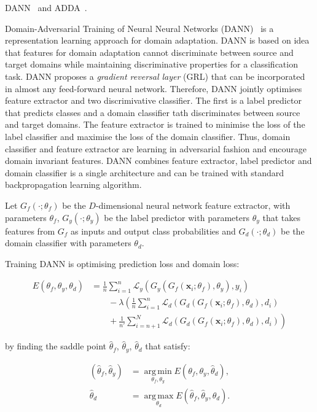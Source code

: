 DANN~\cite{ganin2016} and ADDA~\cite{tzeng2017}.

Domain-Adversarial Training of Neural Neural Networks (DANN)~\cite{ganin2016}
is a representation learning approach for domain adaptation.
DANN is based on idea that features for domain adaptation
cannot discriminate between source and target domains
while maintaining discriminative properties for a classification task.
DANN proposes a \textit{gradient reversal layer} (GRL)
that can be incorporated in almost any feed-forward neural network.
Therefore, DANN jointly optimises feature extractor
and two discrimivative classifier.
The first is a label predictor that predicts classes
and a domain classifier tath discriminates between source and target domains.
The feature extractor is trained to minimise the loss of the label classifier
and maximise the loss of the domain classifier.
Thus, domain classifier and feature extractor are learning in adversarial fashion and encourage domain invariant features.
DANN combines feature extractor, label predictor and domain classifier is a single architecture
and can be trained with standard backpropagation learning algorithm.

Let \(G_f(\cdot; \theta_f)\) be the \(D\)-dimensional neural network feature extractor, with parameters \(\theta_f\),
\(G_y(\cdot; \theta_y)\) be the label predictor with parameters \(\theta_y\)
that takes features from \(G_f\) as inputs and output class probabilities
and \(G_d(\cdot; \theta_d)\) be the domain classifier with parameters \(\theta_d\).

Training DANN is optimising prediction loss and domain loss:

\begin{align}
	E(\theta_f, \theta_y, \theta_d) &= \frac{1}{n} \sum^{n}_{i = 1} \mathcal{L}_y(G_y(G_f(\mathbf{x}_i; \theta_f), \theta_y), y_i) \nonumber \\
	&\qquad {} - \lambda \left(\frac{1}{n} \sum^{n}_{i = 1} \mathcal{L}_d(G_d(G_f(\mathbf{x}_i; \theta_f), \theta_d), d_i) \right. \nonumber \\
	&\qquad \left. {} + \frac{1}{n'} \sum^{N}_{i = n + 1} \mathcal{L}_d(G_d(G_f(\mathbf{x}_i; \theta_f), \theta_d), d_i)\right)
\end{align}

by finding the saddle point \(\hat{\theta}_f\), \(\hat{\theta}_y\), \(\hat{\theta}_d\) that satisfy:

\begin{align}
	(\hat{\theta}_f, \hat{\theta}_y)
	&= \operatorname*{arg\,min}_{\theta_f, \theta_y} E(\theta_f, \theta_y, \hat{\theta}_d),\\
	\hat{\theta}_d
	&= \operatorname*{arg\,max}_{\theta_d} E(\hat{\theta}_f, \hat{\theta}_y, \theta_d).
\end{align}

